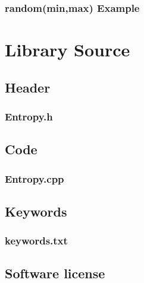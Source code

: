 \documentclass[10pt]{report}
\newcommand{\code}[2]{
 \hrulefill
 \subsection*{#1}
 
 \vspace{2em}
}
\begin{document}
\code{random(min,max) Example}{random_minmax_example.ino}

\chapter{Library Source}

\section{Header}

\code{Entropy.h}{../Entropy.h}

\section{Code}

\code{Entropy.cpp}{../Entropy.cpp}

\section{Keywords}

\code{keywords.txt}{../keywords.txt}

\section{Software license}

\code{}{../gpl.txt}




\end{document}

